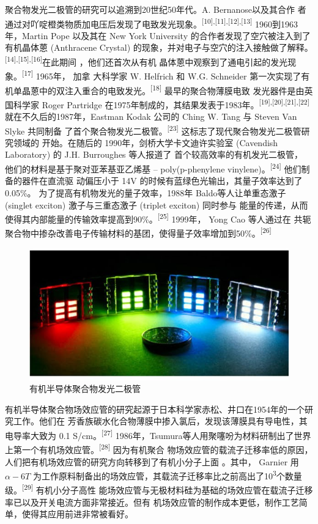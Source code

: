 \documentclass[12pt,]{report}
\begin{document}
聚合物发光二极管的研究可以追溯到20世纪50年代。A. Bernanose以及其合作
者通过对吖啶橙类物质加电压后发现了电致发光现象。\textsuperscript{{[}10{]},{[}11{]},{[}12{]},{[}13{]}}
1960到1963年，Martin Pope 以及其在 New York University
的合作者发现了空穴被注入到了有机晶体蒽 (Anthracene Crystal)
的现象，并对电子与空穴的注入接触做了解释。\textsuperscript{{[}14{]},{[}15{]},{[}16{]}}在此期间
，他们还首次从有机
晶体蒽中观察到了通电引起的发光现象。\textsuperscript{{[}17{]}} 1965年，
加拿 大科学家 W. Helfrich 和 W.G. Schneider
第一次实现了有机单晶蒽中的双注入重合的电致发光。\textsuperscript{{[}18{]}}
最早的聚合物薄膜电致 发光器件是由英国科学家 Roger Partridge
在1975年制成的，其结果发表于1983年。\textsuperscript{{[}19{]},{[}20{]},{[}21{]},{[}22{]}}
就在不久后的1987年，Eastman Kodak 公司的 Ching W. Tang 与 Steven Van
Slyke 共同制备 了首个聚合物发光二极管。\textsuperscript{{[}23{]}}
这标志了现代聚合物发光二极管研究领域的 开始。在随后的
1990年，剑桥大学卡文迪许实验室 (Cavendish Laboratory) 的 J.H. Burroughes
等人报道了 首个较高效率的有机发光二极管，
他们的材料是基于聚对亚苯基亚乙烯基 -- poly(p-phenylene
vinylene)。\textsuperscript{{[}24{]}} 他们制备的器件在直流驱 动偏压小于
14V 的时候有蓝绿色光输出，其量子效率达到了0.05\%。
为了提高有机物发光的量子效率，1988年 Baldo等人让单重态激子 (singlet
exciton) 激子与三重态激子 (triplet exciton) 同时参与
能量的传递，从而使得其内部能量的传输效率提高到90\%。\textsuperscript{{[}25{]}}
1999年， Yong Cao 等人通过在
共轭聚合物中掺杂改善电子传输材料的基团，使得量子效率增加到50\%。\textsuperscript{{[}26{]}}

\begin{figure}[h!]
    \centering
    \includegraphics[scale=0.6]{./figures/pled.jpeg}
    \caption{有机半导体聚合物发光二极管}
    \label{fig:pled}
\end{figure}

有机半导体聚合物场效应管的研究起源于日本科学家赤松、井口在1954年的一个研究工作。他们在
芳香族碳水化合物薄膜中掺入氯后，发现该薄膜具有导电性，其电导率大致为 0.1
S/cm。\textsuperscript{{[}27{]}}
1986年，Tsumura等人用聚噻吩为材料研制出了世界上第一个有机场效应管。\textsuperscript{{[}28{]}}
因为有机聚合
物场效应管的载流子迁移率低的原因，人们把有机场效应管的研究方向转移到了有机小分子上面
。其中， Garnier 用 \(\alpha-6T\)
为工作原料制备出的场效应管，其载流子迁移率比之前高出了10\textsuperscript{3}个数量级。\textsuperscript{{[}29{]}}
有机小分子高性
能场效应管与无极材料硅为基础的场效应管在载流子迁移率已以及开关电流方面非常接近。但有
机场效应管的制作成本更低，制作工艺简单，使得其应用前进非常被看好。
\end{document}
